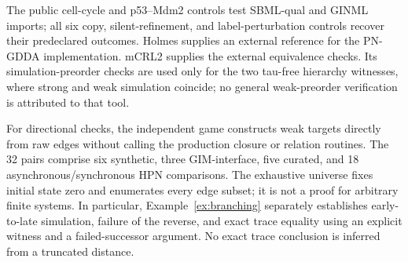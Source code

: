 \documentclass{ws-jbcb}
\numberwithin{equation}{section}
\begin{document}
\begin{table}[!htbp]
\end{table}

The public cell-cycle and p53--Mdm2 controls test SBML-qual and GINML imports;
all six copy, silent-refinement, and label-perturbation controls recover their
predeclared outcomes.\cite{Naldi2018,Chaouiya2013SBML,Traynard2016,AbouJaoude2009}
Holmes supplies an external reference for the PN-GDDA implementation.
\cite{Radom2017} mCRL2 supplies the external equivalence checks.
\cite{Bunte2019} Its simulation-preorder checks are used only for the two
tau-free hierarchy witnesses, where strong and weak simulation coincide;
no general weak-preorder verification is attributed to that tool.

For directional checks, the independent game constructs weak targets directly
from raw edges without calling the production closure or relation routines.
The 32 pairs comprise six synthetic, three GIM-interface, five curated, and
18 asynchronous/synchronous HPN comparisons. The exhaustive universe fixes
initial state zero and enumerates every edge subset; it is not a proof for
arbitrary finite systems. In particular, Example~\ref{ex:branching} separately
establishes early-to-late simulation, failure of the reverse, and exact trace
equality using an explicit witness and a failed-successor argument. No exact
trace conclusion is inferred from a truncated distance.
\end{document}
